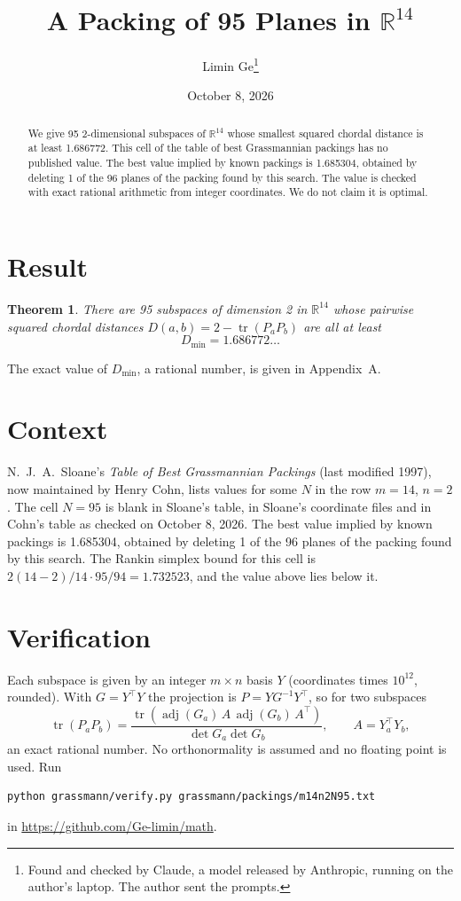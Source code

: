 \documentclass[11pt,a4paper]{article}
\title{A Packing of 95 Planes in $\mathbb{R}^{14}$}
\author{Limin Ge\thanks{Found and checked by Claude, a model released by Anthropic, running on the author's laptop. The author sent the prompts.}}
\date{October 8, 2026}
\newtheorem*{theorem}{Theorem}
\begin{document}
\maketitle
\begin{abstract}
We give 95 2-dimensional subspaces of $\mathbb{R}^{14}$ whose smallest squared chordal distance is at least 1.686772. This cell of the table of best Grassmannian packings has no published value. The best value implied by known packings is 1.685304, obtained by deleting 1 of the 96 planes of the packing found by this search. The value is checked with exact rational arithmetic from integer coordinates. We do not claim it is optimal.
\end{abstract}

\section{Result}
\begin{theorem}
There are 95 subspaces of dimension 2 in $\mathbb{R}^{14}$ whose pairwise squared chordal distances $D(a,b) = 2 - \operatorname{tr}(P_aP_b)$ are all at least
\[ D_{\min} = 1.686772\ldots \]
\end{theorem}
The exact value of $D_{\min}$, a rational number, is given in Appendix~A.


\section{Context}
N.~J.~A.~Sloane's \emph{Table of Best Grassmannian Packings} (last modified 1997), now maintained by Henry Cohn, lists values for some $N$ in the row $m=14$, $n=2$. The cell $N=95$ is blank in Sloane's table, in Sloane's coordinate files and in Cohn's table as checked on October 8, 2026. The best value implied by known packings is 1.685304, obtained by deleting 1 of the 96 planes of the packing found by this search. The Rankin simplex bound for this cell is $2(14-2)/14\cdot 95/94 = 1.732523$, and the value above lies below it.


\section{Verification}
Each subspace is given by an integer $m\times n$ basis $Y$ (coordinates times $10^{12}$, rounded). With $G=Y^\top Y$ the projection is $P=YG^{-1}Y^\top$, so for two subspaces
\[ \operatorname{tr}(P_aP_b)=\frac{\operatorname{tr}(\operatorname{adj}(G_a)\,A\,\operatorname{adj}(G_b)\,A^\top)}{\det G_a\det G_b},\qquad A=Y_a^\top Y_b, \]
an exact rational number. No orthonormality is assumed and no floating point is used. Run
\begin{verbatim}
python grassmann/verify.py grassmann/packings/m14n2N95.txt
\end{verbatim}
in \url{https://github.com/Ge-limin/math}.
\end{document}
